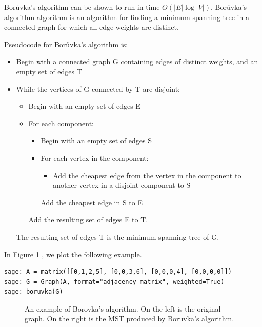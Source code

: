 Bor\r{u}vka's algorithm can be shown to run in time
$O(|E|\log |V|)$.
Bor\r{u}vka's algorithm algorithm is an algorithm
for finding a minimum spanning tree in a connected graph for
which all edge weights are distinct.

Pseudocode for Bor\r{u}vka's algorithm is:

\begin{itemize}
\item
Begin with a connected graph G containing edges of distinct
 weights, and an empty set of edges T
\item
While the vertices of G connected by T are disjoint:
\begin{itemize}
\item
Begin with an empty set of edges E
\item
         For each component:
\begin{itemize}
\item
        Begin with an empty set of edges S
\item
        For each vertex in the component:
 \begin{itemize}
\item
Add the cheapest edge from the vertex in
             the component to another vertex in a disjoint component to S
\end{itemize}
        Add the cheapest edge in S to E
\end{itemize}
    Add the resulting set of edges E to T.
\end{itemize}
The resulting set of edges T is the minimum spanning tree of G.
\end{itemize}

\begin{example}
In Figure \ref{fig:tree-forests:Boruvkas-algorithm} , we plot the following example.
{\rm
\begin{lstlisting}
sage: A = matrix([[0,1,2,5], [0,0,3,6], [0,0,0,4], [0,0,0,0]])
sage: G = Graph(A, format="adjacency_matrix", weighted=True)
sage: boruvka(G)
\end{lstlisting}
}

\begin{figure}[!htbp]
\centering

\caption{An example of Borovka's algorithm. On the left is the
  original graph. On the right is the MST produced by Boruvka's algorithm.}
\label{fig:tree-forests:Boruvkas-algorithm}
\end{figure}

\end{example}

